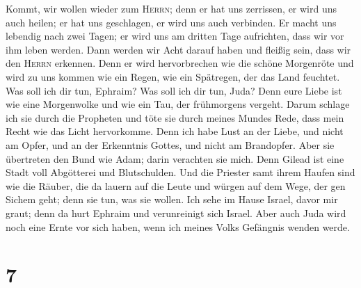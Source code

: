  Kommt, wir wollen wieder zum \textsc{Herrn}; denn er hat
uns zerrissen, er wird uns auch heilen; er hat uns geschlagen, er wird
uns auch verbinden.  Er macht uns lebendig nach zwei
Tagen; er wird uns am dritten Tage aufrichten, dass wir vor ihm leben
werden.  Dann werden wir Acht darauf haben und fleißig
sein, dass wir den \textsc{Herrn} erkennen. Denn er wird hervorbrechen
wie die schöne Morgenröte und wird zu uns kommen wie ein Regen, wie ein
Spätregen, der das Land feuchtet.  Was soll ich dir tun,
Ephraim? Was soll ich dir tun, Juda? Denn eure Liebe ist wie eine
Morgenwolke und wie ein Tau, der frühmorgens vergeht. 
Darum schlage ich sie durch die Propheten und töte sie durch meines
Mundes Rede, dass mein Recht wie das Licht hervorkomme. 
Denn ich habe Lust an der Liebe, und nicht am Opfer, und an der
Erkenntnis Gottes, und nicht am Brandopfer.  Aber sie
übertreten den Bund wie Adam; darin verachten sie mich. 
Denn Gilead ist eine Stadt voll Abgötterei und Blutschulden.
 Und die Priester samt ihrem Haufen sind wie die Räuber,
die da lauern auf die Leute und würgen auf dem Wege, der gen Sichem
geht; denn sie tun, was sie wollen.  Ich sehe im Hause
Israel, davor mir graut; denn da hurt Ephraim und verunreinigt sich
Israel.  Aber auch Juda wird noch eine Ernte vor sich
haben, wenn ich meines Volks Gefängnis wenden werde.

\hypertarget{section-6}{%
\section{7}\label{section-6}}

